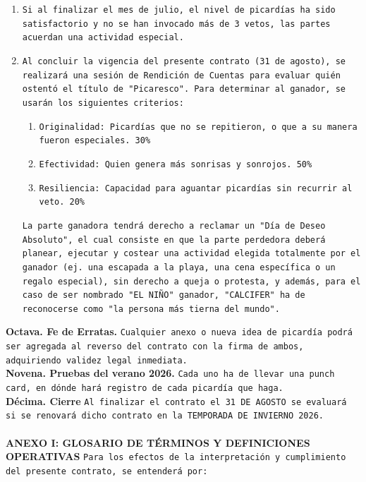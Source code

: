 \documentclass[11pt]{scrartcl}
\begin{document}
\begin{enumerate}
    \item \texttt{Si al finalizar el mes de julio, el nivel de picardías ha sido satisfactorio y no se han invocado más de 3 vetos, las partes acuerdan una actividad especial.}
    \item \texttt{Al concluir la vigencia del presente contrato (31 de agosto), se realizará una sesión de Rendición de Cuentas para evaluar quién ostentó el título de "Picaresco".
    Para determinar al ganador, se usarán los siguientes criterios:}
    \begin{enumerate}
        \item \texttt{Originalidad: Picardías que no se repitieron, o que a su manera fueron especiales. 30\%}
        \item \texttt{Efectividad: Quien genera más sonrisas y sonrojos. 50\%}
        \item \texttt{Resiliencia: Capacidad para aguantar picardías sin recurrir al veto. 20\%} 
    \end{enumerate}
    \texttt{La parte ganadora tendrá derecho a reclamar un "Día de Deseo Absoluto", el cual consiste en que la parte perdedora deberá planear, ejecutar y costear una actividad elegida totalmente por el ganador
    (ej. una escapada a la playa, una cena específica o un regalo especial), sin derecho a queja o protesta, y además, para el caso de ser nombrado "EL NIÑO" ganador, "CALCIFER" ha de reconocerse como "la persona
    más tierna del mundo".}
\end{enumerate}
\textbf{Octava. Fe de Erratas.} \texttt{Cualquier anexo o nueva idea de picardía podrá ser agregada al reverso del contrato con la firma de ambos, adquiriendo validez legal inmediata.} \\
\textbf{Novena. Pruebas del verano 2026.} \texttt{Cada uno ha de llevar una punch card, en dónde hará registro de cada picardía que haga.} \\
\textbf{Décima. Cierre} \texttt{Al finalizar el contrato el 31 DE AGOSTO se evaluará si se renovará dicho contrato en la TEMPORADA DE INVIERNO 2026.} \\ \\
\textbf{ANEXO I: GLOSARIO DE TÉRMINOS Y DEFINICIONES OPERATIVAS}
\texttt{Para los efectos de la interpretación y cumplimiento del presente contrato, se entenderá por:}
\end{document}
